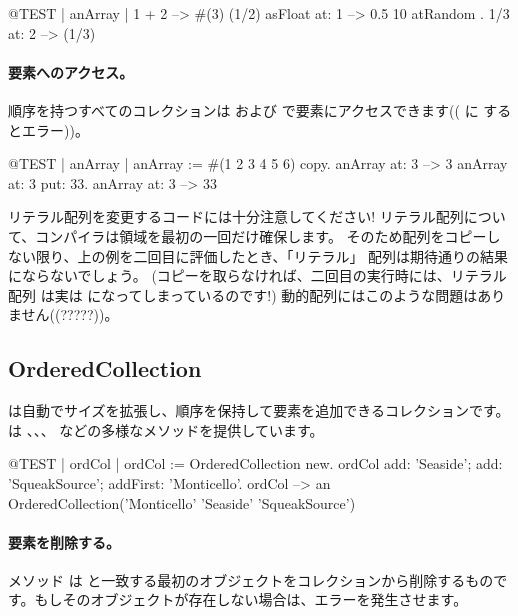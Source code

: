 \documentclass[a4paper,10pt,twoside]{book}
\begin{document}
\begin{code}{@TEST | anArray |}
{ 1 + 2 } --> #(3)
{(1/2) asFloat} at: 1 --> 0.5
{10 atRandom . 1/3} at: 2 --> (1/3)
\end{code}

\paragraph{要素へのアクセス。}
順序を持つすべてのコレクションは  および  で要素にアクセスできます(( に  するとエラー))。

\begin{code}{@TEST | anArray |}
anArray := #(1 2 3 4 5 6) copy.
anArray at: 3 --> 3
anArray at: 3 put: 33.
anArray at: 3 --> 33
\end{code}

\noindent
リテラル配列を変更するコードには十分注意してください!
リテラル配列について、コンパイラは領域を最初の一回だけ確保します。
そのため配列をコピーしない限り、上の例を二回目に評価したとき、「リテラル」 配列は期待通りの結果にならないでしょう。
(コピーを取らなければ、二回目の実行時には、リテラル配列  は実は  になってしまっているのです!)
動的配列にはこのような問題はありません((?????))。

\subsection{OrderedCollection}
 は自動でサイズを拡張し、順序を保持して要素を追加できるコレクションです。 は 、、、 などの多様なメソッドを提供しています。

\begin{code}{@TEST | ordCol |}
ordCol := OrderedCollection new.
ordCol add: 'Seaside'; add: 'SqueakSource'; addFirst: 'Monticello'.
ordCol --> an OrderedCollection('Monticello' 'Seaside' 'SqueakSource')
\end{code}

\paragraph{要素を削除する。} メソッド   は  と一致する最初のオブジェクトをコレクションから削除するものです。もしそのオブジェクトが存在しない場合は、エラーを発生させます。
\end{document}
